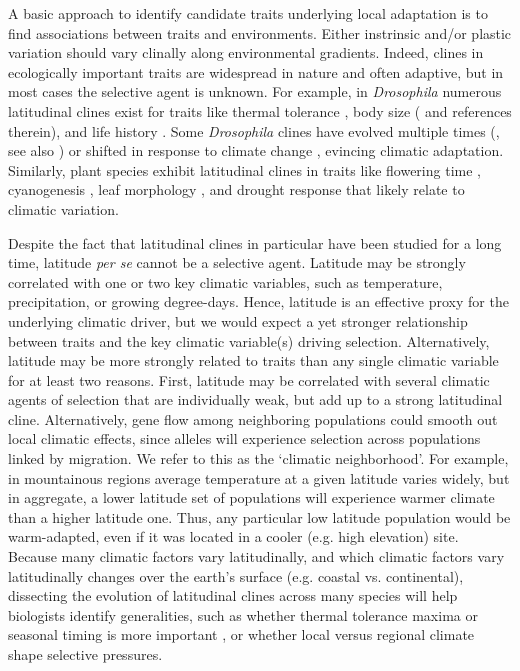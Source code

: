 \documentclass[11pt, oneside]{article}
\begin{document}
A basic approach to identify candidate traits underlying local adaptation is to find associations between traits and environments. Either instrinsic and/or plastic variation should vary clinally along environmental gradients. Indeed, clines in ecologically important traits are widespread in nature \citep{Endler_1977} and often adaptive, but in most cases the selective agent is unknown. For example, in \textit{Drosophila} numerous latitudinal clines exist for traits like thermal tolerance \citep{Hoffmann_etal_2002}, body size (\cite{Coyne_Beecham_1987} and references therein), and life history \citep{Schmidt_etal_2005}. Some \textit{Drosophila} clines have evolved multiple times (\cite{Oakeshott_etal_1982, Huey_etal_2000}, see also \cite{Bradshaw_Holzapfel_2001}) or shifted in response to climate change \citep{Umina_etal_2005}, evincing climatic adaptation. Similarly, plant species exhibit latitudinal clines in traits like flowering time \citep{Stinchcombe_etal_2004}, cyanogenesis \citep{Kooyers_Olsen_2012}, leaf morphology \citep{Hopkins_etal_2008}, and drought response \citep{Kooyers_etal_2015} that likely relate to climatic variation. 

Despite the fact that latitudinal clines in particular have been studied for a long time, latitude \textit{per se} cannot be a selective agent. Latitude may be strongly correlated with one or two key climatic variables, such as temperature, precipitation, or growing degree-days. Hence, latitude is an effective proxy for the underlying climatic driver, but we would expect a yet stronger relationship between traits and the key climatic variable(s) driving selection. Alternatively, latitude may be more strongly related to traits than any single climatic variable for at least two reasons. First, latitude may be correlated with several climatic agents of selection that are individually weak, but add up to a strong latitudinal cline. Alternatively, gene flow among neighboring populations could smooth out local climatic effects, since alleles will experience selection across populations linked by migration. We refer to this as the `climatic neighborhood'. For example, in mountainous regions average temperature at a given latitude varies widely, but in aggregate, a lower latitude set of populations will experience warmer climate than a higher latitude one. Thus, any particular low latitude population would be warm-adapted, even if it was located in a cooler (e.g. high elevation) site. Because many climatic factors vary latitudinally, and which climatic factors vary latitudinally changes over the earth's surface (e.g. coastal vs. continental), dissecting the evolution of latitudinal clines across many species will help biologists identify generalities, such as whether thermal tolerance maxima or seasonal timing is more important \citep{Bradshaw_Holzapfel_2008}, or whether local versus regional climate shape selective pressures.
\end{document}
